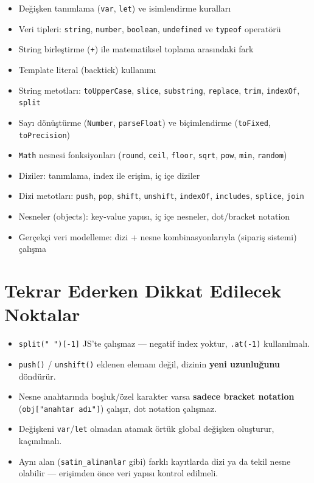 \documentclass[11pt,a4paper]{article}
\begin{document}
\begin{itemize}[leftmargin=1.2em]
\item Değişken tanımlama (\texttt{var}, \texttt{let}) ve isimlendirme kuralları
\item Veri tipleri: \texttt{string}, \texttt{number}, \texttt{boolean}, \texttt{undefined} ve \texttt{typeof} operatörü
\item String birleştirme (\texttt{+}) ile matematiksel toplama arasındaki fark
\item Template literal (backtick) kullanımı
\item String metotları: \texttt{toUpperCase}, \texttt{slice}, \texttt{substring}, \texttt{replace}, \texttt{trim}, \texttt{indexOf}, \texttt{split}
\item Sayı dönüştürme (\texttt{Number}, \texttt{parseFloat}) ve biçimlendirme (\texttt{toFixed}, \texttt{toPrecision})
\item \texttt{Math} nesnesi fonksiyonları (\texttt{round}, \texttt{ceil}, \texttt{floor}, \texttt{sqrt}, \texttt{pow}, \texttt{min}, \texttt{random})
\item Diziler: tanımlama, index ile erişim, iç içe diziler
\item Dizi metotları: \texttt{push}, \texttt{pop}, \texttt{shift}, \texttt{unshift}, \texttt{indexOf}, \texttt{includes}, \texttt{splice}, \texttt{join}
\item Nesneler (objects): key-value yapısı, iç içe nesneler, dot/bracket notation
\item Gerçekçi veri modelleme: dizi + nesne kombinasyonlarıyla (sipariş sistemi) çalışma
\end{itemize}

\section{Tekrar Ederken Dikkat Edilecek Noktalar}

\begin{itemize}[leftmargin=1.2em]
\item \texttt{split(" ")[-1]} JS'te çalışmaz --- negatif index yoktur, \texttt{.at(-1)} kullanılmalı.
\item \texttt{push()} / \texttt{unshift()} eklenen elemanı değil, dizinin \textbf{yeni uzunluğunu} döndürür.
\item Nesne anahtarında boşluk/özel karakter varsa \textbf{sadece bracket notation} (\texttt{obj["anahtar adı"]}) çalışır, dot notation çalışmaz.
\item Değişkeni \texttt{var}/\texttt{let} olmadan atamak örtük global değişken oluşturur, kaçınılmalı.
\item Aynı alan (\texttt{satin\_alinanlar} gibi) farklı kayıtlarda dizi ya da tekil nesne olabilir --- erişimden önce veri yapısı kontrol edilmeli.
\end{itemize}
\end{document}
